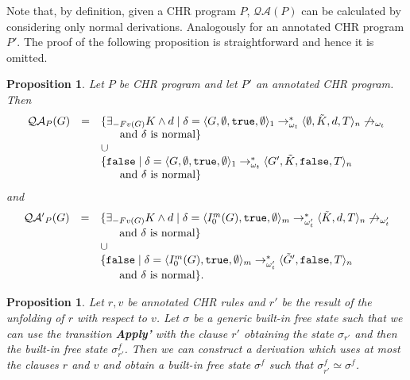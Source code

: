 \documentclass[final]{acmtrans2e}
\newtheorem{proposition}[theorem]{Proposition}
\begin{document}
Note that, by definition, given a CHR program $P$, $\mathcal{QA}(P)$ can be calculated by
considering only normal derivations. Analogously for an annotated CHR program $P'$.
The proof  of the following proposition is straightforward and hence it is omitted.

\begin{proposition}\label{prop:solonorm}
Let $P$ be CHR program  and let $P'$ an annotated CHR program.
Then
$$
\begin{array}{lcl}
\mathcal{QA}_P(G) &=&
\{\exists_{-Fv(G)}K\wedge d \mid
\delta= \langle
G,\emptyset,{\tt true}, \emptyset \rangle_1
\rightarrow^*_{\omega_t}
\langle \emptyset, \tilde K, d, T\rangle_n\not\rightarrow_{\omega_t}\\
&&\hspace{0.6cm}\mbox{and $\delta$ is normal}\}\\
&&\cup\\
&&\{{\tt false}\mid \delta = \langle G,\emptyset,{\tt true},
\emptyset \rangle_1 \rightarrow^*_{\omega_t} \langle G', \tilde K,
{\tt false}, T\rangle_n\\
&&\hspace{0.6cm}\mbox{and $\delta$ is normal}\}
\end{array}
$$
and
$$\begin{array}{lcl}
\mathcal{QA'}_P(G) &=&
\{\exists_{-Fv(G)}K\wedge d \mid
\delta=\langle I_0^m (G),
{\tt true}, \emptyset\rangle_m\rightarrow^{*}_{\omega'_t}
\langle \tilde K, d, T\rangle_n\not\rightarrow_{\omega'_t}\\
&&\hspace{0.6cm}\mbox{and $\delta$ is normal}\}\\
&& \cup\\
&&\{{\tt false}\mid
\delta=\langle I_0^m(G),
{\tt true},\emptyset\rangle_m\rightarrow^{*}_{\omega'_t}\langle
\tilde G', {\tt false}, T\rangle_n\\
&&\hspace{0.6cm}\mbox{and $\delta$ is normal}\}.
\end{array}
$$
\end{proposition}

\begin{proposition}\label{prop:servequality}
Let $r, v$ be annotated CHR rules and $r'$  be the result
of the unfolding of $r$ with respect to $v$. Let $\sigma$ be a generic built-in free state such that we can use the transition \textbf{Apply'} with the clause $r'$ obtaining the state $\sigma_{r'}$ and then the built-in free state $\sigma_{r'}^f$. Then we can construct a derivation which uses at most the clauses $r$ and $v$ and obtain a built-in free state $\sigma^f$ such that $\sigma_{r'}^f \simeq \sigma^f$.
\end{proposition}
\end{document}
